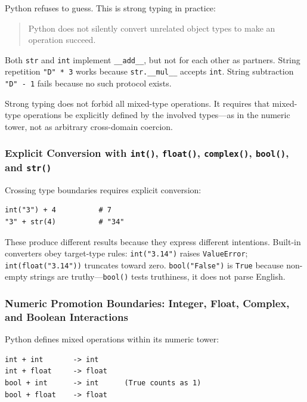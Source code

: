 \documentclass[a4paper,twoside]{report}
\begin{document}
Python refuses to guess. This is strong typing in practice:

\begin{quote}
Python does not silently convert unrelated object types to make an operation succeed.
\end{quote}

Both \texttt{str} and \texttt{int} implement \texttt{\_\_add\_\_}, but not for each other as partners. String repetition \texttt{"D" * 3} works because \texttt{str.\_\_mul\_\_} accepts \texttt{int}. String subtraction \texttt{"D" - 1} fails because no such protocol exists.

Strong typing does not forbid all mixed-type operations. It requires that mixed-type operations be explicitly defined by the involved types---as in the numeric tower, not as arbitrary cross-domain coercion.

\subsubsection{Explicit Conversion with \texttt{int()}, \texttt{float()}, \texttt{complex()}, \texttt{bool()}, and \texttt{str()}}

Crossing type boundaries requires explicit conversion:

\begin{verbatim}
int("3") + 4          # 7
"3" + str(4)          # "34"
\end{verbatim}

These produce different results because they express different intentions. Built-in converters obey target-type rules: \texttt{int("3.14")} raises \texttt{ValueError}; \texttt{int(float("3.14"))} truncates toward zero. \texttt{bool("False")} is \texttt{True} because non-empty strings are truthy---\texttt{bool()} tests truthiness, it does not parse English.

\subsubsection{Numeric Promotion Boundaries: Integer, Float, Complex, and Boolean Interactions}

Python defines mixed operations within its numeric tower:

\begin{verbatim}
int + int       -> int
int + float     -> float
bool + int      -> int      (True counts as 1)
bool + float    -> float
\end{verbatim}
\end{document}

